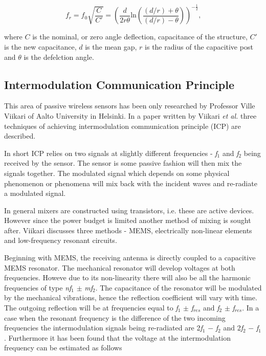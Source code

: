 \documentclass[11pt,a4paper]{article}
\begin{document}
\begin{equation}
f_r = f_0\sqrt{\frac{C}{C'}} = \left(\frac{d}{2r\theta}\textrm{ln}\left(\frac{(d/r)+\theta}{(d/r)-\theta}\right)\right)^{-\frac{1}{2}}\textrm{,}
\end{equation}

where $C$ is the nominal, or zero angle deflection, capacitance of the structure, $C'$ is the new capacitance, $d$ is the mean gap, $r$ is the radius of the capacitive post and $\theta$ is the defelction angle.

\subsection{Intermodulation Communication Principle}

This area of passive wireless sensors has been only researched by Professor Ville Viikari of Aalto University in Helsinki. In a paper written by Viikari \textit{et al.}\cite{imc_review} three techniques of achieving intermodulation communication principle (ICP) are described.

In short ICP relies on two signals at slightly different frequencies - \textit{f}$_1$ and \textit{f}$_2$ being received by the sensor. The sensor is some passive fashion will then mix the signals together. The modulated signal which depends on some physical phenomenon or phenomena will mix back with the incident waves and re-radiate a modulated signal.

In general mixers are constructed using transistors, i.e. these are active devices. However since the power budget is limited another method of mixing is sought after. Viikari discusses three methods - MEMS, electrically non-linear elements and low-frequency resonant circuits.

Beginning with MEMS, the receiving antenna is directly coupled to a capacitive MEMS resonator. The mechanical resonator will develop voltages at both frequencies. Howeve due to its non-linearity there will also be all the harmonic frequencies of type \textit{nf}$_1$ $\pm$ \textit{mf}$_2$. The capacitance of the resonator will be modulated by the mechanical vibrations, hence the reflection coefficient will vary with time. The outgoing reflection will be at frequencies equal to \textit{f}$_1$ $\pm$ \textit{f}$_{res}$ and \textit{f}$_2$ $\pm$ \textit{f}$_{res}$. In a case when the resonant frequency is the difference of the two incoming frequencies the intermodulation signals being re-radiated are 2\textit{f}$_1$ $-$ \textit{f}$_2$ and 2\textit{f}$_2$ $-$ \textit{f}$_1$. Furthermore it has been found that the voltage at the intermodulation frequency can be estimated as follows \cite{rfidMEMS}
\end{document}

